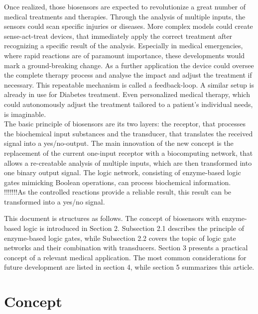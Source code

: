 \documentclass[runningheads]{llncs}
\begin{document}
	Once realized, those biosensors are expected to revolutionize a great number of medical treatments and therapies. Through the analysis of multiple inputs, the sensors could scan specific injuries or diseases. More complex models could create sense-act-treat devices, that immediately apply the correct treatment after recognizing a specific result of the analysis. Especially in medical emergencies, where rapid reactions are of paramount importance, these developments would mark a ground-breaking change. As a further application the device could oversee the complete therapy process and analyse the impact and adjust the treatment if necessary. This repeatable mechanism is called a feedback-loop. A similar setup is already in use for Diabetes treatment. Even personalized medical therapy, which could autonomously adjust the treatment tailored to a patient’s individual needs, is imaginable.\\
	
	The basic principle of biosensors are its two layers: the receptor, that processes the biochemical input substances and the transducer, that translates the received signal into a yes/no-output. The main innovation of the new concept is the replacement of the current one-input receptor with a biocomputing network, that allows a re-creatable analysis of multiple inputs, which are then transformed into one binary output signal. The logic network, consisting of enzyme-based logic gates mimicking Boolean operations, can process biochemical information.\\
	 
	!!!!!!!As the controlled reactions provide a reliable result, this result can be transformed into a yes/no signal.
	
	This document is structures as follows. The concept of biosensors with enzyme-based logic is introduced in Section 2. Subsection 2.1 describes the principle of enzyme-based logic gates, while Subsection 2.2 covers the topic of logic gate networks and their combination with transducers. Section 3 presents a practical concept of a relevant medical application. The most common considerations for future development are listed in section 4, while section 5 summarizes this article.
	
	
	
	
	
\section{Concept}
\end{document}
